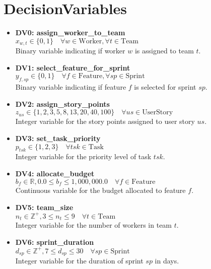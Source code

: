 \documentclass[11pt]{article}
\begin{document}
\section{DecisionVariables}
\begin{itemize}
    \item \textbf{DV0: assign\_worker\_to\_team} \\
    $x_{w,t} \in \{0, 1\} \quad \forall w \in \text{Worker}, \forall t \in \text{Team}$ \\
    Binary variable indicating if worker $w$ is assigned to team $t$.
    
    \item \textbf{DV1: select\_feature\_for\_sprint} \\
    $y_{f,sp} \in \{0, 1\} \quad \forall f \in \text{Feature}, \forall sp \in \text{Sprint}$ \\
    Binary variable indicating if feature $f$ is selected for sprint $sp$.
    
    \item \textbf{DV2: assign\_story\_points} \\
    $z_{us} \in \{1,2,3,5,8,13,20,40,100\} \quad \forall us \in \text{UserStory}$ \\
    Integer variable for the story points assigned to user story $us$.
    
    \item \textbf{DV3: set\_task\_priority} \\
    $p_{tsk} \in \{1, 2, 3\} \quad \forall tsk \in \text{Task}$ \\
    Integer variable for the priority level of task $tsk$.
    
    \item \textbf{DV4: allocate\_budget} \\
    $b_f \in \mathbb{R}, 0.0 \leq b_f \leq 1,000,000.0 \quad \forall f \in \text{Feature}$ \\
    Continuous variable for the budget allocated to feature $f$.
    
    \item \textbf{DV5: team\_size} \\
    $n_t \in \mathbb{Z}^+, 3 \leq n_t \leq 9 \quad \forall t \in \text{Team}$ \\
    Integer variable for the number of workers in team $t$.
    
    \item \textbf{DV6: sprint\_duration} \\
    $d_{sp} \in \mathbb{Z}^+, 7 \leq d_{sp} \leq 30 \quad \forall sp \in \text{Sprint}$ \\
    Integer variable for the duration of sprint $sp$ in days.
    

\end{itemize}
\end{document}
